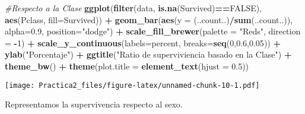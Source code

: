 \documentclass[]{article}
\newenvironment{Shaded}{\begin{snugshade}}{\end{snugshade}}
\newcommand{\KeywordTok}[1]{\textcolor[rgb]{0.13,0.29,0.53}{\textbf{#1}}}
\newcommand{\DataTypeTok}[1]{\textcolor[rgb]{0.13,0.29,0.53}{#1}}
\newcommand{\DecValTok}[1]{\textcolor[rgb]{0.00,0.00,0.81}{#1}}
\newcommand{\FloatTok}[1]{\textcolor[rgb]{0.00,0.00,0.81}{#1}}
\newcommand{\StringTok}[1]{\textcolor[rgb]{0.31,0.60,0.02}{#1}}
\newcommand{\CommentTok}[1]{\textcolor[rgb]{0.56,0.35,0.01}{\textit{#1}}}
\newcommand{\OtherTok}[1]{\textcolor[rgb]{0.56,0.35,0.01}{#1}}
\newcommand{\OperatorTok}[1]{\textcolor[rgb]{0.81,0.36,0.00}{\textbf{#1}}}
\newcommand{\NormalTok}[1]{#1}
\begin{document}
\begin{Shaded}
\begin{Highlighting}[]
\CommentTok{#Respecto a la Clase}
\KeywordTok{ggplot}\NormalTok{(}\KeywordTok{filter}\NormalTok{(data, }\KeywordTok{is.na}\NormalTok{(Survived)}\OperatorTok{==}\OtherTok{FALSE}\NormalTok{), }\KeywordTok{aes}\NormalTok{(Pclass, }\DataTypeTok{fill=}\NormalTok{Survived)) }\OperatorTok{+}\StringTok{ }
\StringTok{  }\KeywordTok{geom_bar}\NormalTok{(}\KeywordTok{aes}\NormalTok{(}\DataTypeTok{y =}\NormalTok{ (..count..)}\OperatorTok{/}\KeywordTok{sum}\NormalTok{(..count..)), }\DataTypeTok{alpha=}\FloatTok{0.9}\NormalTok{, }\DataTypeTok{position=}\StringTok{"dodge"}\NormalTok{) }\OperatorTok{+}
\StringTok{  }\KeywordTok{scale_fill_brewer}\NormalTok{(}\DataTypeTok{palette =} \StringTok{"Reds"}\NormalTok{, }\DataTypeTok{direction =} \OperatorTok{-}\DecValTok{1}\NormalTok{) }\OperatorTok{+}
\StringTok{  }\KeywordTok{scale_y_continuous}\NormalTok{(}\DataTypeTok{labels=}\NormalTok{percent, }\DataTypeTok{breaks=}\KeywordTok{seq}\NormalTok{(}\DecValTok{0}\NormalTok{,}\FloatTok{0.6}\NormalTok{,}\FloatTok{0.05}\NormalTok{)) }\OperatorTok{+}
\StringTok{  }\KeywordTok{ylab}\NormalTok{(}\StringTok{"Porcentaje"}\NormalTok{) }\OperatorTok{+}\StringTok{ }
\StringTok{  }\KeywordTok{ggtitle}\NormalTok{(}\StringTok{"Ratio de superviviencia basado en la Clase"}\NormalTok{) }\OperatorTok{+}
\StringTok{  }\KeywordTok{theme_bw}\NormalTok{() }\OperatorTok{+}
\StringTok{  }\KeywordTok{theme}\NormalTok{(}\DataTypeTok{plot.title =} \KeywordTok{element_text}\NormalTok{(}\DataTypeTok{hjust =} \FloatTok{0.5}\NormalTok{))}
\end{Highlighting}
\end{Shaded}

\texttt{[image: Practica2\_files/figure-latex/unnamed-chunk-10-1.pdf]}

Representamos la supervivencia respecto al sexo.
\end{document}
